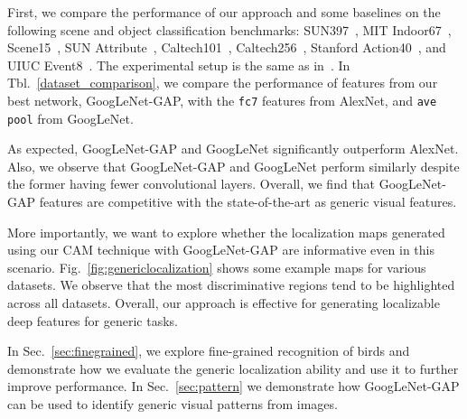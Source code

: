 \documentclass[10pt,twocolumn,letterpaper]{article}
\begin{document}
First, we compare the performance of our approach and some baselines on the following scene and object classification benchmarks: SUN397~\cite{xiao2010sun}, MIT Indoor67~\cite{quattoni2009recognizing}, Scene15~\cite{lazebnik2006beyond}, SUN Attribute~\cite{patterson2012sun}, Caltech101~\cite{fei2007learning}, Caltech256~\cite{griffin2007caltech}, Stanford Action40~\cite{yao2011human}, and UIUC Event8~\cite{li2007and}. The experimental setup is the same as in~\cite{zhou2014learning}. In Tbl.~\ref{dataset_comparison}, we compare the performance of features from our best network, GoogLeNet-GAP, with the \texttt{fc7} features from AlexNet, and \texttt{ave pool} from GoogLeNet. 

As expected, GoogLeNet-GAP and GoogLeNet significantly outperform AlexNet. Also, we observe that GoogLeNet-GAP and GoogLeNet perform similarly despite the former having fewer convolutional layers. Overall, we find that GoogLeNet-GAP features are competitive with the state-of-the-art as generic visual features.

More importantly, we want to explore whether the localization maps generated using our CAM technique with GoogLeNet-GAP are informative even in this scenario. Fig.~\ref{fig:genericlocalization} shows some example maps for various datasets. We observe that the most discriminative regions tend to be highlighted across all datasets. Overall, our approach is effective for generating localizable deep features for generic tasks.

In Sec.~\ref{sec:finegrained}, we explore fine-grained recognition of birds and demonstrate how we evaluate the generic localization ability and use it to further improve performance. In Sec.~\ref{sec:pattern} we demonstrate how GoogLeNet-GAP can be used to identify generic visual patterns from images.


\end{document}

